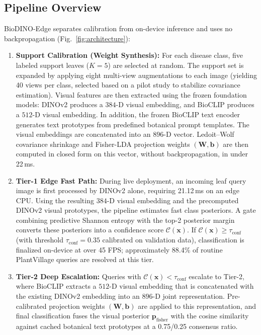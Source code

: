 \documentclass[conference]{IEEEtran}
\begin{document}
\subsection{Pipeline Overview}
\label{sec:pipeline_overview}
BioDINO-Edge separates calibration from on-device inference and uses no backpropagation (Fig.~\ref{fig:architecture}):
\begin{enumerate}
    \setlength{\itemsep}{1pt plus 0.5pt}\setlength{\parsep}{0pt}
    \item[\textbf{1)}] \textbf{Support Calibration (Weight Synthesis):} For each disease class, five labeled support leaves ($K=5$) are selected at random. The support set is expanded by applying eight multi-view augmentations to each image (yielding 40 views per class, selected based on a pilot study to stabilize covariance estimation). Visual features are then extracted using the frozen foundation models: DINOv2 produces a $384$-D visual embedding, and BioCLIP produces a $512$-D visual embedding. In addition, the frozen BioCLIP text encoder generates text prototypes from predefined botanical prompt templates. The visual embeddings are concatenated into an $896$-D vector. Ledoit--Wolf covariance shrinkage and Fisher-LDA projection weights $(\mathbf{W}, \mathbf{b})$ are then computed in closed form on this vector, without backpropagation, in under 22\,ms.
    \item[\textbf{2)}] \textbf{Tier-1 Edge Fast Path:} During live deployment, an incoming leaf query image is first processed by DINOv2 alone, requiring 21.12\,ms on an edge CPU. Using the resulting $384$-D visual embedding and the precomputed DINOv2 visual prototypes, the pipeline estimates fast class posteriors. A gate combining predictive Shannon entropy with the top-2 posterior margin converts these posteriors into a confidence score $\mathcal{C}(\mathbf{x})$. If $\mathcal{C}(\mathbf{x}) \ge \tau_{\text{conf}}$ (with threshold $\tau_{\text{conf}} = 0.35$ calibrated on validation data), classification is finalized on-device at over 45 FPS; approximately 88.4\% of routine PlantVillage queries are resolved at this tier.
    \item[\textbf{3)}] \textbf{Tier-2 Deep Escalation:} Queries with $\mathcal{C}(\mathbf{x}) < \tau_{\text{conf}}$ escalate to Tier-2, where BioCLIP extracts a $512$-D visual embedding that is concatenated with the existing DINOv2 embedding into an $896$-D joint representation. Pre-calibrated projection weights $(\mathbf{W}, \mathbf{b})$ are applied to this representation, and final classification fuses the visual posterior $\mathbf{p}_{\text{fisher}}$ with the cosine similarity against cached botanical text prototypes at a 0.75/0.25 consensus ratio.

\end{enumerate}
\end{document}
